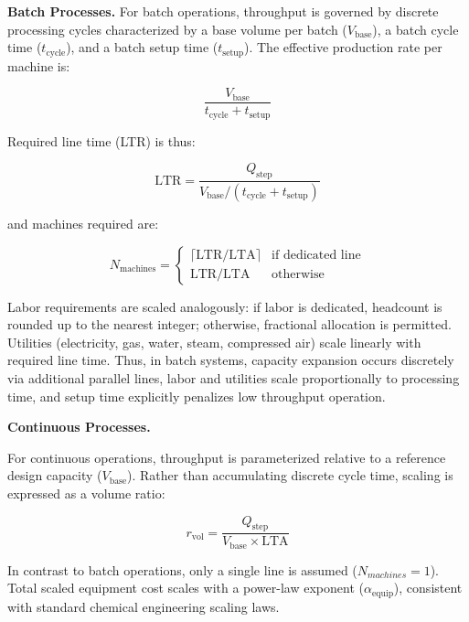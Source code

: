 \documentclass{article}
\renewcommand\_{\textunderscore\allowbreak}
\newcommand{\alteq}[1]{}
\newcommand{\alteqend}{}
\begin{document}
\noindent\textbf{Batch Processes.}\quad
For batch operations, throughput is governed by discrete processing cycles characterized by a base volume per batch ($V_{\text{base}}$), a batch cycle time ($t_{\text{cycle}}$), and a batch setup time ($t_{\text{setup}}$). The effective production rate per machine is:
\alteq{Base volume divided by the sum of cycle time and setup time.}
\begin{equation}
    \frac{V_{\text{base}}}{t_{\text{cycle}} + t_{\text{setup}}}
\end{equation}
\alteqend
Required line time (LTR) is thus:
\alteq{Line time required equals the step throughput Q-step divided by the base volume per cycle-plus-setup time.}
\begin{equation}
    \text{LTR} = \frac{Q_{\text{step}}}{V_{\text{base}} / (t_{\text{cycle}} + t_{\text{setup}})}
\end{equation}
\alteqend
and machines required are:
\alteq{Number of machines equals the ceiling of line time required divided by line time available if a dedicated line, or simply line time required divided by line time available otherwise.}
\begin{equation}
    N_{\text{machines}} = 
    \begin{cases}
        \lceil \text{LTR} / \text{LTA} \rceil & \text{if dedicated line} \\
        \text{LTR} / \text{LTA} & \text{otherwise}
    \end{cases}
\end{equation}
\alteqend
Labor requirements are scaled analogously: if labor is dedicated, headcount is rounded up to the nearest integer; otherwise, fractional allocation is permitted. Utilities (electricity, gas, water, steam, compressed air) scale linearly with required line time. Thus, in batch systems, capacity expansion occurs discretely via additional parallel lines, labor and utilities scale proportionally to processing time, and setup time explicitly penalizes low throughput operation.

\medskip
\noindent\textbf{Continuous Processes.}\quad

For continuous operations, throughput is parameterized relative to a reference design capacity ($V_{\text{base}}$). Rather than accumulating discrete cycle time, scaling is expressed as a volume ratio:
\alteq{Volume ratio r-vol equals the step throughput Q-step divided by the product of base design capacity V-base and line time available.}
\begin{equation}
    r_{\text{vol}} = \frac{Q_{\text{step}}}{V_{\text{base}} \times \text{LTA}}
\end{equation}
\alteqend
In contrast to batch operations, only a single line is assumed ($N_{machines} = 1$). Total scaled equipment cost scales with a power-law exponent ($\alpha_{\text{equip}}$), consistent with standard chemical engineering scaling laws. 
\end{document}
